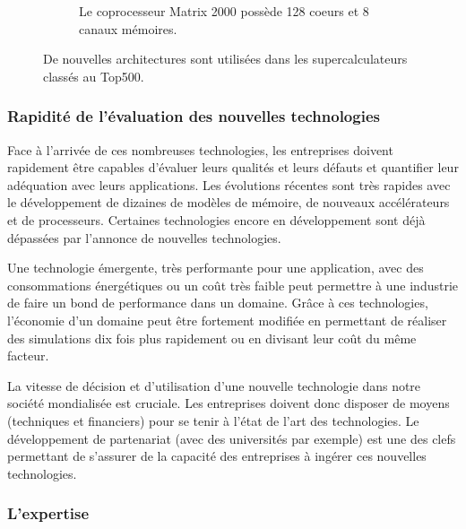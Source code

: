 \begin{figure}[t!]
\begin{subfigure}[t]{0.48\textwidth}
                \caption{\label{fig:edlp_matrix_2000}Le coprocesseur Matrix 2000 possède 128 coeurs et 8 canaux mémoires.}
            \end{subfigure}
            \caption{\label{fig:new_proc} De nouvelles architectures sont utilisées dans les supercalculateurs classés au Top500.}
        \end{figure}

           
    \subsubsection{Rapidité de l'évaluation des nouvelles technologies} \label{sec:edl_chal_vitesse}
        
        Face à l'arrivée de ces nombreuses technologies, les entreprises doivent rapidement être capables d'évaluer leurs qualités et leurs défauts et quantifier leur adéquation avec leurs applications. Les évolutions récentes sont très rapides avec le développement de dizaines de modèles de mémoire, de nouveaux accélérateurs et de processeurs. Certaines technologies encore en développement sont déjà dépassées par l’annonce de nouvelles technologies.
        
        Une technologie émergente, très performante pour une application, avec des consommations énergétiques ou un coût très faible peut permettre à une industrie de faire un bond de performance dans un domaine. Grâce à ces technologies, l'économie d'un domaine peut être fortement modifiée en permettant de réaliser des simulations dix fois plus rapidement ou en divisant leur coût du même facteur.
                
        La vitesse de décision et d'utilisation d'une nouvelle technologie dans notre société mondialisée est cruciale. Les entreprises doivent donc disposer de moyens (techniques et financiers) pour se tenir à l'état de l'art des technologies. Le développement de partenariat (avec des universités par exemple) est une des clefs permettant de s’assurer de la capacité des entreprises à ingérer ces nouvelles technologies.


    \subsubsection{L'expertise}\label{sec:edl_chal_expertise}

